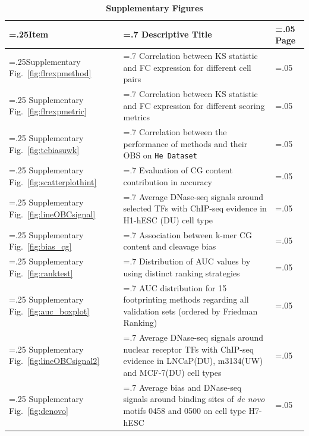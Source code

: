 \documentclass[11pt]{article}
\begin{document}
\begin{table}[h!]
\small
\begin{flushleft}
\caption*{\textbf{{\small Supplementary Figures}}}
\vspace{-0.4cm}
\end{flushleft}
\begin{center}
\renewcommand{\arraystretch}{1.2}
\begin{tabularx}{\textwidth}{ |>{\hsize=.25\hsize}X|>{\hsize=.7\hsize}X|>{\hsize=.05\hsize}X| }
\hline
\textbf{Item} & \textbf{Descriptive Title} & \textbf{Page}  \\
\hline
Supplementary Fig.~\ref{fig:flrexpmethod} & Correlation between KS statistic and FC expression for different cell pairs & \pageref{fig:flrexpmethod} \\
\hline
Supplementary Fig.~\ref{fig:flrexpmetric} & Correlation between KS statistic and FC expression for different scoring metrics & \pageref{fig:flrexpmetric} \\
\hline
Supplementary Fig.~\ref{fig:tcbiasuwk} & Correlation between the performance of methods and their OBS on {\tt He Dataset} & \pageref{fig:tcbiasuwk} \\
\hline
Supplementary Fig.~\ref{fig:scatterplothint} & Evaluation of CG content contribution in accuracy & \pageref{fig:scatterplothint} \\
\hline
Supplementary Fig.~\ref{fig:lineOBCsignal} & Average DNase-seq signals around selected TFs with ChIP-seq evidence in H1-hESC (DU) cell type & \pageref{fig:lineOBCsignal} \\
\hline
Supplementary Fig.~\ref{fig:bias_cg} & Association between k-mer CG content and cleavage bias & \pageref{fig:bias_cg} \\
\hline
Supplementary Fig.~\ref{fig:ranktest} & Distribution of AUC values by using distinct ranking strategies & \pageref{fig:ranktest} \\
\hline
Supplementary Fig.~\ref{fig:auc_boxplot} & AUC distribution for 15 footprinting methods regarding all validation sets (ordered by Friedman Ranking) & \pageref{fig:auc_boxplot} \\
\hline
Supplementary Fig.~\ref{fig:lineOBCsignal2} & Average DNase-seq signals around nuclear receptor TFs with ChIP-seq evidence in LNCaP(DU), m3134(UW) and MCF-7(DU) cell types & \pageref{fig:lineOBCsignal2} \\
\hline
Supplementary Fig.~\ref{fig:denovo} & Average bias and DNase-seq signals around binding sites of \emph{de novo} motifs 0458 and 0500 on cell type H7-hESC & \pageref{fig:denovo} \\
\hline
\end{tabularx}
\end{center}
\end{table}
\end{document}
